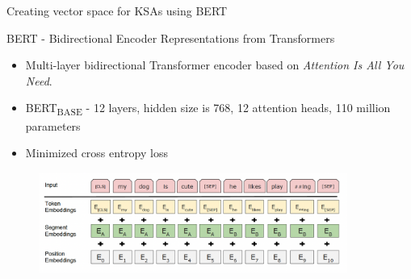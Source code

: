 \documentclass{beamer}
\begin{document}
\begin{frame}{Creating vector space for KSAs using BERT}

  BERT - Bidirectional Encoder Representations from Transformers\cite{bert}
  \begin{itemize}
    \item Multi-layer bidirectional Transformer encoder based on \textit{Attention Is All You Need}.\cite{attention}
    \item BERT\textsubscript{BASE} - 12 layers, hidden size is 768, 12 attention heads, 110 million parameters
    \item Minimized cross entropy loss
  \end{itemize}
  
  \begin{figure}[ht!]
    \centering
    \includegraphics[width=0.9\textwidth]{images/bert.png}
  \end{figure}
  
\end{frame}

\end{document}
